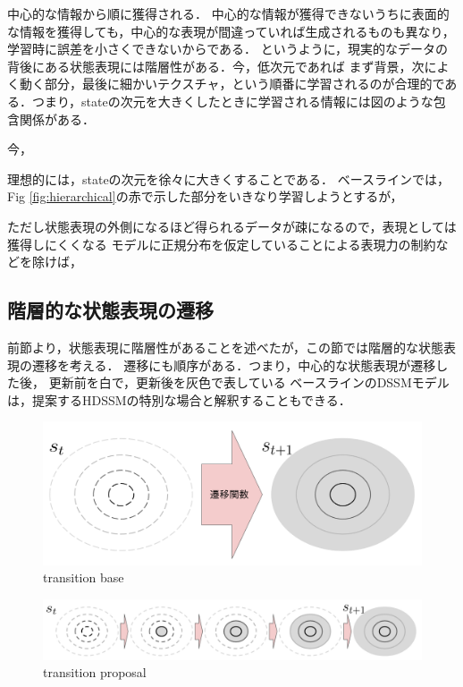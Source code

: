 中心的な情報から順に獲得される．
中心的な情報が獲得できないうちに表面的な情報を獲得しても，中心的な表現が間違っていれば生成されるものも異なり，学習時に誤差を小さくできないからである．
というように，現実的なデータの背後にある状態表現には階層性がある．今，低次元であれば
まず背景，次によく動く部分，最後に細かいテクスチャ，という順番に学習されるのが合理的である．つまり，stateの次元を大きくしたときに学習される情報には図のような包含関係がある．

今，

理想的には，stateの次元を徐々に大きくすることである．
ベースラインでは，Fig \ref{fig:hierarchical}の赤で示した部分をいきなり学習しようとするが，


ただし状態表現の外側になるほど得られるデータが疎になるので，表現としては獲得しにくくなる
モデルに正規分布を仮定していることによる表現力の制約などを除けば，

\subsection{階層的な状態表現の遷移}
前節より，状態表現に階層性があることを述べたが，この節では階層的な状態表現の遷移を考える．
遷移にも順序がある．つまり，中心的な状態表現が遷移した後，
更新前を白で，更新後を灰色で表している
ベースラインのDSSMモデルは，提案するHDSSMの特別な場合と解釈することもできる．


\begin{figure}[tbp]
  \begin{center}
    \includegraphics[width=0.5\linewidth]{./figures/transition_base.png}
    \caption{transition base}
    \label{fig:transition_base}
  \end{center}
\end{figure}


\begin{figure}[tbp]
  \begin{center}
    \includegraphics[width=0.8\linewidth]{./figures/transition_proposal.png}
    \caption{transition proposal}
    \label{fig:transition_proposal}
  \end{center}
\end{figure}

